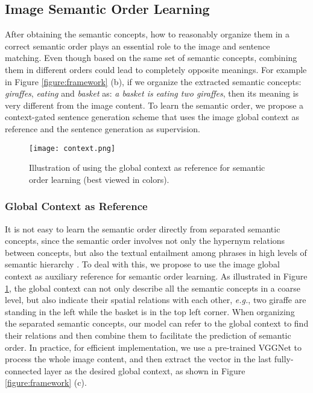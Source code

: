 \documentclass[10pt,twocolumn,letterpaper]{article}
\begin{document}
\subsection{Image Semantic Order Learning}
After obtaining the semantic concepts, how to reasonably organize them
in a correct semantic order plays an essential role to the image and sentence matching.
Even though based on the same set of semantic concepts,
combining them in different orders could lead to completely opposite meanings.
For example in Figure \ref{figure:framework} (b), if we organize the extracted
semantic concepts: \emph{giraffes}, \emph{eating} and \emph{basket}
as: \emph{a basket is eating two giraffes}, then its meaning is very
different from the image content.
To learn the semantic order, we propose a context-gated
sentence generation scheme that uses the image global context as reference and the
sentence generation as supervision.


\begin{figure}[t]
\centering
\texttt{[image: context.png]}
\caption{Illustration of using the global context as reference for semantic order learning
(best viewed in colors).
}
\label{figure:context}
\end{figure}


\vspace{-3mm}
\subsubsection{Global Context as Reference}
\vspace{-1mm}
It is not easy to learn the semantic order directly from separated semantic concepts,
since the semantic order involves not only the hypernym relations between concepts,
but also the textual entailment among phrases in
high levels of semantic hierarchy \cite{vendrov2015order}.
To deal with this,
we propose to use the image global context as auxiliary reference
for semantic order learning.
As illustrated in Figure \ref{figure:context},
the global context can not only describe all the semantic concepts in a coarse level,
but also indicate their spatial relations with each other,
\emph{e.g.}, two giraffe are standing in the left while the basket is in the top left corner.
When organizing the separated semantic concepts,
our model can refer to the global context
to find their relations and then combine them to facilitate the prediction of semantic order.
In practice, for efficient implementation,
we use a pre-trained VGGNet to process the whole image content,
and then extract the vector in the last fully-connected layer
as the desired global context, as shown in Figure \ref{figure:framework} (c).
\end{document}
